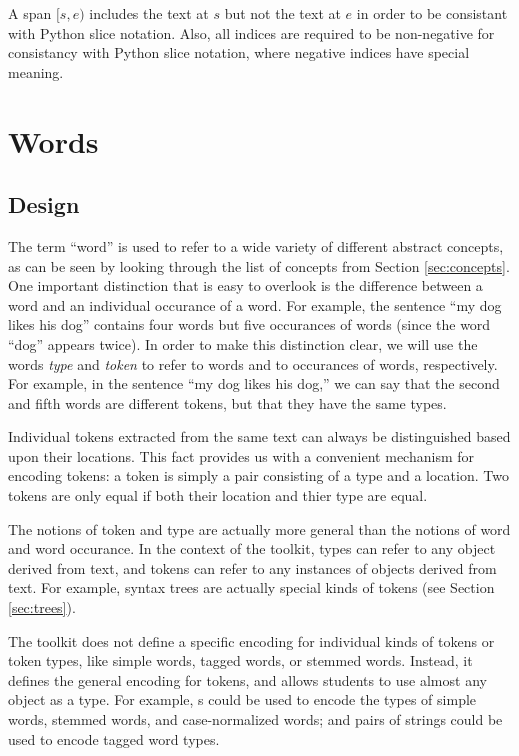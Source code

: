 \documentclass[11pt]{article}
\begin{document}
  A span $[s,e)$ includes the text at $s$ but not the text at $e$ in
  order to be consistant with Python slice notation.  Also, all
  indices are required to be non-negative for consistancy with Python
  slice notation, where negative indices have special meaning.

\section{Words}
\label{sec:words}

  \subsection{Design}

  The term ``word'' is used to refer to a wide variety of different
  abstract concepts, as can be seen by looking through the list of
  concepts from Section \ref{sec:concepts}.  One important distinction
  that is easy to overlook is the difference between a word and an
  individual occurance of a word.  For example, the sentence ``my dog
  likes his dog'' contains four words but five occurances of words
  (since the word ``dog'' appears twice).  In order to make this
  distinction clear, we will use the words \emph{type} and
  \emph{token} to refer to words and to occurances of words,
  respectively.  For example, in the sentence ``my dog likes his
  dog,'' we can say that the second and fifth words are different
  tokens, but that they have the same types.

  Individual tokens extracted from the same text can always be
  distinguished based upon their locations.  This fact provides us
  with a convenient mechanism for encoding tokens: a token is simply a
  pair consisting of a type and a location.  Two tokens are only equal
  if both their location and thier type are equal.

  The notions of token and type are actually more general than the
  notions of word and word occurance.  In the context of the toolkit,
  types can refer to any object derived from text, and tokens can
  refer to any instances of objects derived from text.  For example,
  syntax trees are actually special kinds of tokens (see Section
  \ref{sec:trees}).  

  The toolkit does not define a specific encoding for individual kinds
  of tokens or token types, like simple words, tagged words, or
  stemmed words.  Instead, it defines the general encoding for tokens,
  and allows students to use almost any object as a type.  For
  example, s could be used to encode the types of simple
  words, stemmed words, and case-normalized words; and pairs of
  strings could be used to encode tagged word types.
\end{document}
